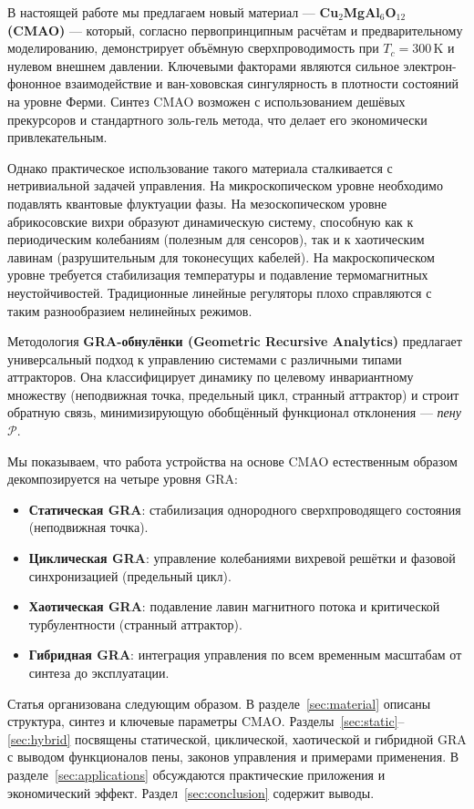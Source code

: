 \documentclass[12pt,a4paper]{article}
\numberwithin{equation}{section}
\begin{document}
В настоящей работе мы предлагаем новый материал — \textbf{Cu$_2$MgAl$_6$O$_{12}$ (CMAO)} — который, согласно первопринципным расчётам и предварительному моделированию, демонстрирует объёмную сверхпроводимость при $T_c = 300$\,K и нулевом внешнем давлении. Ключевыми факторами являются сильное электрон-фононное взаимодействие и ван-хововская сингулярность в плотности состояний на уровне Ферми. Синтез CMAO возможен с использованием дешёвых прекурсоров и стандартного золь-гель метода, что делает его экономически привлекательным.

Однако практическое использование такого материала сталкивается с нетривиальной задачей управления. На микроскопическом уровне необходимо подавлять квантовые флуктуации фазы. На мезоскопическом уровне абрикосовские вихри образуют динамическую систему, способную как к периодическим колебаниям (полезным для сенсоров), так и к хаотическим лавинам (разрушительным для токонесущих кабелей). На макроскопическом уровне требуется стабилизация температуры и подавление термомагнитных неустойчивостей. Традиционные линейные регуляторы плохо справляются с таким разнообразием нелинейных режимов.

Методология \textbf{GRA-обнулёнки (Geometric Recursive Analytics)} \cite{Petrov2025} предлагает универсальный подход к управлению системами с различными типами аттракторов. Она классифицирует динамику по целевому инвариантному множеству (неподвижная точка, предельный цикл, странный аттрактор) и строит обратную связь, минимизирующую обобщённый функционал отклонения — \textit{пену} $\mathcal{P}$.

Мы показываем, что работа устройства на основе CMAO естественным образом декомпозируется на четыре уровня GRA:
\begin{itemize}
    \item \textbf{Статическая GRA}: стабилизация однородного сверхпроводящего состояния (неподвижная точка).
    \item \textbf{Циклическая GRA}: управление колебаниями вихревой решётки и фазовой синхронизацией (предельный цикл).
    \item \textbf{Хаотическая GRA}: подавление лавин магнитного потока и критической турбулентности (странный аттрактор).
    \item \textbf{Гибридная GRA}: интеграция управления по всем временным масштабам от синтеза до эксплуатации.
\end{itemize}

Статья организована следующим образом. В разделе~\ref{sec:material} описаны структура, синтез и ключевые параметры CMAO. Разделы~\ref{sec:static}--\ref{sec:hybrid} посвящены статической, циклической, хаотической и гибридной GRA с выводом функционалов пены, законов управления и примерами применения. В разделе~\ref{sec:applications} обсуждаются практические приложения и экономический эффект. Раздел~\ref{sec:conclusion} содержит выводы.
\end{document}
